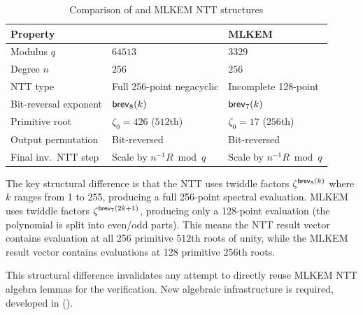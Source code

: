 \begin{table}[htbp]
\centering
\caption{Comparison of \haetae{} and MLKEM NTT structures}
\label{tab:haetae_mlkem}
\begin{tabular}{lll}
\toprule
Property & \haetae{} & MLKEM \\
\midrule
Modulus $q$ & $64513$ & $3329$ \\
Degree $n$ & $256$ & $256$ \\
NTT type & Full 256-point negacyclic & Incomplete 128-point \\
Bit-reversal exponent & $\mathsf{brev}_8(k)$ & $\mathsf{brev}_7(k)$ \\
Primitive root & $\zeta_0 = 426$ ($512$th) & $\zeta_0 = 17$ ($256$th) \\
Output permutation & Bit-reversed & Bit-reversed \\
Final inv.\ NTT step & Scale by $n^{-1} R \bmod q$ & Scale by $n^{-1} R \bmod q$ \\
\bottomrule
\end{tabular}
\end{table}

The key structural difference is that the \haetae{} NTT uses twiddle factors
$\zeta^{\mathsf{brev}_8(k)}$ where $k$ ranges from 1 to 255, producing a full 256-point
spectral evaluation.  MLKEM uses twiddle factors $\zeta^{\mathsf{brev}_7(2k+1)}$,
producing only a 128-point evaluation (the polynomial is split into even/odd
parts).  This means the \haetae{} NTT result vector contains evaluation at
all 256 primitive $512$th roots of unity, while the MLKEM result vector
contains evaluations at 128 primitive $256$th roots.

This structural difference invalidates any attempt to directly reuse MLKEM NTT
algebra lemmas for the \haetae{} verification.  New algebraic infrastructure
is required, developed in  ().
